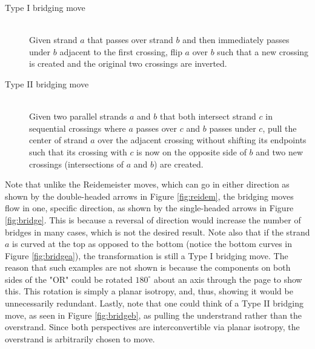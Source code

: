 \documentclass[titlepage]{article}
\begin{document}
\begin{defi}
    \begin{description}
        \item[Type I bridging move] \hfill \\ Given strand $a$ that passes over strand $b$ and then immediately passes under $b$ adjacent to the first crossing, flip $a$ over $b$ such that a new crossing is created and the original two crossings are inverted.
        \item[Type II bridging move] \hfill \\ Given two parallel strands $a$ and $b$ that both intersect strand $c$ in sequential crossings where $a$ passes over $c$ and $b$ passes under $c$, pull the center of strand $a$ over the adjacent crossing without shifting its endpoints such that its crossing with $c$ is now on the opposite side of $b$ and two new crossings (intersections of $a$ and $b$) are created.
    \end{description}
\end{defi}

Note that unlike the Reidemeister moves, which can go in either direction as shown by the double-headed arrows in Figure \ref{fig:reidem}, the bridging moves flow in one, specific direction, as shown by the single-headed arrows in Figure \ref{fig:bridge}. This is because a reversal of direction would increase the number of bridges in many cases, which is not the desired result. Note also that if the strand $a$ is curved at the top as opposed to the bottom (notice the bottom curves in Figure \ref{fig:bridgea}), the transformation is still a Type I bridging move. The reason that such examples are not shown is because the components on both sides of the "OR" could be rotated $180^\circ$ about an axis through the page to show this. This rotation is simply a planar isotropy, and, thus, showing it would be unnecessarily redundant. Lastly, note that one could think of a Type II bridging move, as seen in Figure \ref{fig:bridgeb}, as pulling the understrand rather than the overstrand. Since both perspectives are interconvertible via planar isotropy, the overstrand is arbitrarily chosen to move.\par
\end{document}

